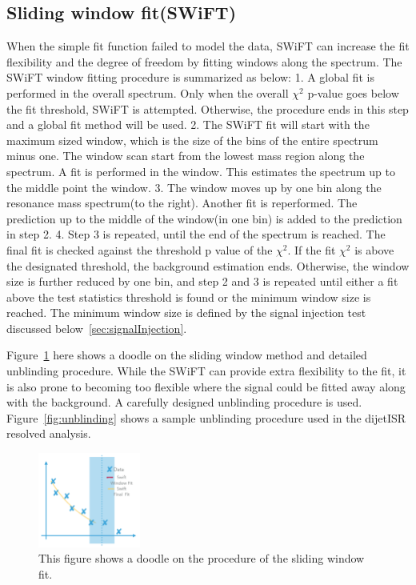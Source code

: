    \subsection{Sliding window fit(SWiFT)}
    When the simple fit function failed to model the data, SWiFT can increase the fit flexibility and the degree of freedom by fitting windows along the spectrum. The SWiFT window fitting procedure is summarized as below:
    1. A global fit is performed in the overall spectrum. Only when the overall $\chi^{2}$ p-value goes below the fit threshold, SWiFT is attempted. Otherwise, the procedure ends in this step and a global fit method will be used. 
    2. The SWiFT fit will start with the maximum sized window, which is the size of the bins of the entire spectrum minus one. The window scan start from the lowest mass region along the spectrum. A fit is performed in the window. This estimates the spectrum up to the middle point the window.
    3. The window moves up by one bin along the resonance mass spectrum(to the right). Another fit is reperformed. The prediction up to the middle of the window(in one bin) is added to the prediction in step 2. 
    4. Step 3 is repeated, until the end of the spectrum is reached. The final fit is checked against the threshold p value of the $\chi^{2}$. If the fit $\chi^{2}$ is above the designated threshold, the background estimation ends. Otherwise, the window size is further reduced by one bin, and step 2 and 3 is repeated until either a fit above the test statistics threshold is found or the minimum window size is reached. The minimum window size is defined by the signal injection test discussed below~\ref{sec:signalInjection}.

    Figure~\ref{fig:swift} here shows a doodle on the sliding window method and detailed unblinding procedure. 
    While the SWiFT can provide extra flexibility to the fit, it is also prone to becoming too flexible where the signal could be fitted away along with the background. A carefully designed unblinding procedure is used. Figure~\ref{fig:unblinding} shows a sample unblinding procedure used in the dijetISR resolved analysis. 

\begin{figure}[!htb]
    \begin{center}
        \includegraphics[width=0.3\textwidth]{figures/chapter_analysismethod/swift2}
        \caption{
            This figure shows a doodle on the procedure of the sliding window fit. 
        }
        \label{fig:swift}
    \end{center}
\end{figure}
\FloatBarrier

